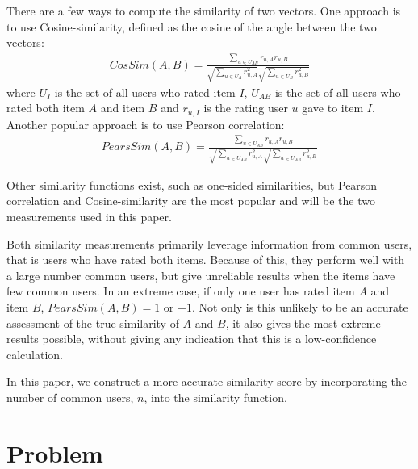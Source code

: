 \documentclass[11pt]{article}
\begin{document}
There are a few ways to compute the similarity of two vectors. One approach is
to use Cosine-similarity, defined as the cosine of the angle between the two
vectors:
\begin{align}
CosSim(A, B) = \frac{\sum\limits_{u\in U_{AB}}
r_{u,A}r_{u,B}}{\sqrt{\sum\limits_{u\in U_{A}} r_{u,A}^2}
\sqrt{\sum\limits_{u\in U_{B}} r_{u,B}^2}}
\end{align}
where $U_{I}$ is the set of all users who rated item $I$, $U_{AB}$ is the set of
all users who rated both item $A$ and item $B$ and $r_{u,I}$ is the rating user
$u$ gave to item $I$. Another popular approach is to use Pearson correlation:
\begin{align}
PearsSim(A, B) = \frac{\sum\limits_{u\in U_{AB}}
r_{u,A}r_{u,B}}{\sqrt{\sum\limits_{u\in U_{AB}} r_{u,A}^2}
\sqrt{\sum\limits_{u\in U_{AB}} r_{u,B}^2}}
\end{align}

Other similarity functions exist, such as one-sided similarities, but Pearson
correlation and Cosine-similarity are the most popular and will be the two
measurements used in this paper. \footnotemark


Both similarity measurements primarily leverage information from common users,
that is users who have rated both items. Because of this, they perform well with
a large number common users, but give unreliable results when the items have few
common users. In an extreme case, if only one user has rated item $A$ and item
$B$, $PearsSim(A, B) = 1$ or $-1$. Not only is this unlikely to be an accurate
assessment of the true similarity of $A$ and $B$, it also gives the most extreme
results possible, without giving any indication that this is a low-confidence
calculation.

In this paper, we construct a more accurate similarity score by incorporating
the number of common users, $n$, into the similarity function. 

\section*{Problem}
\end{document}
